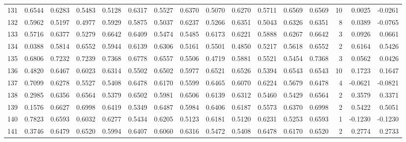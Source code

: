 \begin{tabular}{lrrrrrrrrrrrrrrr}
131 &      0.6544 &  0.6283 &  0.5483 &  0.5128 &  0.6317 &  0.5527 &  0.6370 &  0.5070 &  0.6270 &  0.5711 &   0.6569 &     0.6569 &     10 &                    0.0025 &                    -0.0261 \\
132 &      0.5962 &  0.5197 &  0.4977 &  0.5929 &  0.5875 &  0.5037 &  0.6237 &  0.5266 &  0.6351 &  0.5043 &   0.6326 &     0.6351 &      8 &                    0.0389 &                    -0.0765 \\
133 &      0.5716 &  0.6377 &  0.5279 &  0.6642 &  0.6409 &  0.5474 &  0.5485 &  0.6173 &  0.6221 &  0.5888 &   0.6267 &     0.6642 &      3 &                    0.0926 &                     0.0661 \\
134 &      0.0388 &  0.5814 &  0.6552 &  0.5944 &  0.6139 &  0.6306 &  0.5161 &  0.5501 &  0.4850 &  0.5217 &   0.5618 &     0.6552 &      2 &                    0.6164 &                     0.5426 \\
135 &      0.6806 &  0.7232 &  0.7239 &  0.7368 &  0.6778 &  0.6557 &  0.5506 &  0.4719 &  0.5881 &  0.5521 &   0.5454 &     0.7368 &      3 &                    0.0562 &                     0.0426 \\
136 &      0.4820 &  0.6467 &  0.6023 &  0.6314 &  0.5502 &  0.6502 &  0.5977 &  0.6521 &  0.6526 &  0.5394 &   0.6543 &     0.6543 &     10 &                    0.1723 &                     0.1647 \\
137 &      0.7099 &  0.6278 &  0.5527 &  0.5408 &  0.6478 &  0.6170 &  0.5599 &  0.6465 &  0.6070 &  0.6224 &   0.5679 &     0.6478 &      4 &                   -0.0621 &                    -0.0821 \\
138 &      0.2985 &  0.6356 &  0.6564 &  0.5379 &  0.6502 &  0.5981 &  0.6506 &  0.6139 &  0.6312 &  0.5460 &   0.5429 &     0.6564 &      2 &                    0.3579 &                     0.3371 \\
139 &      0.1576 &  0.6627 &  0.6998 &  0.6419 &  0.5349 &  0.6487 &  0.5984 &  0.6406 &  0.6187 &  0.5573 &   0.6370 &     0.6998 &      2 &                    0.5422 &                     0.5051 \\
140 &      0.7823 &  0.6593 &  0.6032 &  0.6277 &  0.5434 &  0.6205 &  0.5123 &  0.6181 &  0.5120 &  0.6231 &   0.5253 &     0.6593 &      1 &                   -0.1230 &                    -0.1230 \\
141 &      0.3746 &  0.6479 &  0.6520 &  0.5994 &  0.6407 &  0.6060 &  0.6316 &  0.5472 &  0.5408 &  0.6478 &   0.6170 &     0.6520 &      2 &                    0.2774 &                     0.2733 \\

\end{tabular}
